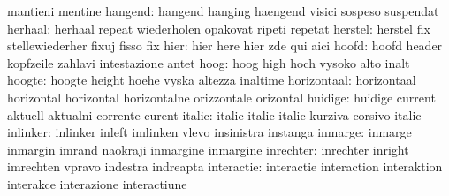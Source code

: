                            mantieni                  mentine
                  hangend: hangend                   hanging
                           haengend                  visici
                           sospeso                   suspendat
                  herhaal: herhaal                   repeat
                           wiederholen               opakovat
                           ripeti                    repetat
                  herstel: herstel                   fix
                           stellewiederher           fixuj
                           fisso                     fix
                     hier: hier                      here
                           hier                      zde
                           qui                       aici
                    hoofd: hoofd                     header
                           kopfzeile                 zahlavi
                           intestazione              antet
                     hoog: hoog                      high
                           hoch                      vysoko
                           alto                      inalt
                   hoogte: hoogte                    height
                           hoehe                     vyska
                           altezza                   inaltime
              horizontaal: horizontaal               horizontal
                           horizontal                horizontalne
                           orizzontale               orizontal
                  huidige: huidige                   current
                           aktuell                   aktualni
                           corrente                  curent
                   italic: italic                    italic
                           italic                    kurziva
                           corsivo                   italic
                 inlinker: inlinker                  inleft
                           imlinken                  vlevo
                           insinistra                instanga
                  inmarge: inmarge                   inmargin
                           imrand                    naokraji
                           inmargine                 inmargine
                inrechter: inrechter                 inright
                           imrechten                 vpravo
                           indestra                  indreapta
               interactie: interactie                interaction
                           interaktion               interakce
                           interazione               interactiune
